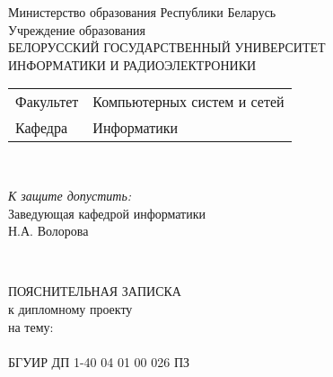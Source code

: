 \begin{titlepage}
  \begin{center}
    Министерство образования Республики Беларусь\\[1em]
    Учреждение образования\\
    БЕЛОРУССКИЙ ГОСУДАРСТВЕННЫЙ УНИВЕРСИТЕТ \\
    ИНФОРМАТИКИ И РАДИОЭЛЕКТРОНИКИ\\[1em]

    \begin{minipage}{\textwidth}
      \begin{flushleft}
        \begin{tabular}{ l l }
          Факультет & Компьютерных систем и сетей\\
          Кафедра   & Информатики
        \end{tabular}
      \end{flushleft}
    \end{minipage}\\[1em]

    \begin{flushright}
      \begin{minipage}{0.4\textwidth}
        \textit{К защите допустить:}\\[0.8em]
        Заведующая кафедрой информатики\\[0.45em]
        \underline{\hspace*{2.8cm}} Н.А. Волорова
      \end{minipage}\\[2.2em]
    \end{flushright}

    {ПОЯСНИТЕЛЬНАЯ ЗАПИСКА}\\
    {к дипломному проекту}\\
    {на тему:}\\[1em]
    \textbf{\large \diplomabig}\\[1em]


    {БГУИР ДП 1-40 04 01 00 026 ПЗ}\\[2em]
    

\end{center}
\end{titlepage}
